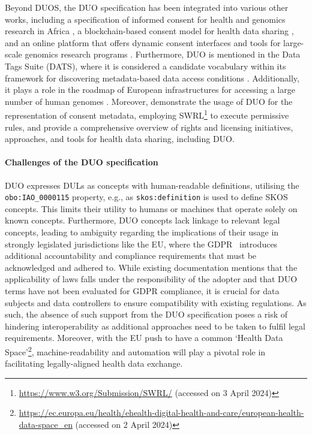 Beyond DUOS, the DUO specification has been integrated into various other works, including a specification of informed consent for health and genomics research in Africa \citep{nembaware_framework_2019}, a blockchain-based consent model for health data sharing \citep{jaiman_consent_2020}, and an online platform that offers dynamic consent interfaces and tools for large-scale genomics research programs \citep{haas_ctrl_2021}.
Furthermore, DUO is mentioned in the Data Tags Suite (DATS), where it is considered a candidate vocabulary within its framework for discovering metadata-based data access conditions \citep{alter_data_2020}.
Additionally, it plays a role in the roadmap of European infrastructures for accessing a large number of human genomes  \citep{saunders_leveraging_2019}.
Moreover, \cite{amith_expressing_2022} demonstrate the usage of DUO for the representation of consent metadata, employing SWRL\footnote{\url{https://www.w3.org/Submission/SWRL/} (accessed on 3 April 2024)} to execute permissive rules, and \cite{grabus_landscape_2019} provide a comprehensive overview of rights and licensing initiatives, approaches, and tools for health data sharing, including DUO.

\paragraph{Challenges of the DUO specification}
DUO expresses DULs as concepts with human-readable definitions, utilising the \texttt{obo:IAO\_0000115} property, e.g., as \texttt{skos:definition} is used to define SKOS concepts.
This limits their utility to humans or machines that operate solely on known concepts.
Furthermore, DUO concepts lack linkage to relevant legal concepts, leading to ambiguity regarding the implications of their usage in strongly legislated jurisdictions like the EU, where the GDPR~\citeyearpar{noauthor_regulation_2016} introduces additional accountability and compliance requirements that must be acknowledged and adhered to.
While existing documentation mentions that the applicability of laws falls under the responsibility of the adopter and that DUO terms have not been evaluated for GDPR compliance, it is crucial for data subjects and data controllers to ensure compatibility with existing regulations.
As such, the absence of such support from the DUO specification poses a risk of hindering interoperability as additional approaches need to be taken to fulfil legal requirements.
Moreover, with the EU push to have a common `Health Data Space'\footnote{\url{https://ec.europa.eu/health/ehealth-digital-health-and-care/european-health-data-space_en} (accessed on 2 April 2024)}, machine-readability and automation will play a pivotal role in facilitating legally-aligned health data exchange.

